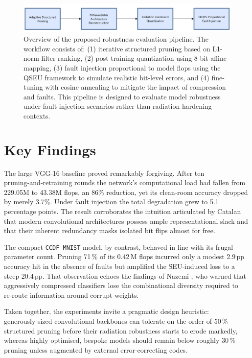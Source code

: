 \begin{figure}[H]
    \centering
    \includegraphics[width=1\linewidth]{images/FLOW.png}
    \caption{Overview of the proposed robustness evaluation pipeline. 
    The workflow consists of: (1) iterative structured pruning based on L1-norm filter ranking, 
    (2) post-training quantization using 8-bit affine mapping, 
    (3) fault injection proportional to model \gls{flops} using the QSEU framework to simulate realistic bit-level errors, and 
    (4) fine-tuning with cosine annealing to mitigate the impact of compression and faults. 
    This pipeline is designed to evaluate model robustness under fault injection scenarios rather than radiation-hardening contexts.}
    \label{fig:method_flow}
\end{figure}









\section{Key Findings}
The large VGG‑16 baseline proved remarkably forgiving. After ten pruning‑and‑retraining rounds the network’s computational load had fallen from 229.05M to 43.38M \gls{flops}, an 86\% reduction, yet its clean‑room accuracy dropped by merely 3.7\%. Under fault injection the total degradation grew to 5.1 percentage points. The result corroborates the intuition articulated by Catalan \cite{Catalan2025} that modern convolutional architectures possess ample representational slack and that their inherent redundancy masks isolated bit flips almost for free. 

The compact \texttt{CCDF\_MNIST} model, by contrast, behaved in line with its frugal parameter count. Pruning 71\,\% of its 0.42\,M \gls{flops} incurred only a modest 2.9\,pp accuracy hit in the absence of faults but amplified the SEU‑induced loss to a steep 20.4\,pp. That observation echoes the findings of Nazemi \cite{Nazemi2021}, who warned that aggressively compressed classifiers lose the combinational diversity required to re‑route information around corrupt weights. 

Taken together, the experiments invite a pragmatic design heuristic: generously‑sized convolutional backbones can tolerate on the order of 50\,\% structured pruning before their radiation robustness starts to erode markedly, whereas highly optimised, bespoke models should remain below roughly 30\,\% pruning unless augmented by external error‑correcting codes.










